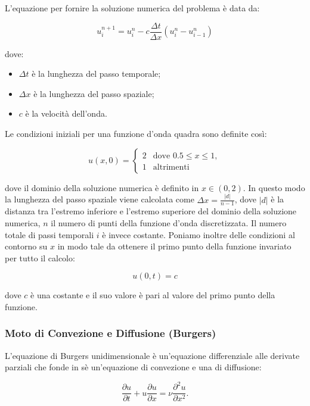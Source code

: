 \noindent
L’equazione per fornire la soluzione numerica del problema è data da:

\begin{equation}
u_i^{n+1} = u_i^n - c \frac{\Delta t}{\Delta x}(u_i^n-u_{i-1}^n)
\end{equation}

\noindent
dove:
\begin{itemize}
\item $\Delta t$ è la lunghezza del passo temporale;
\item $\Delta x$ è la lunghezza del passo spaziale;
\item $c$ è la velocità dell'onda.
\end{itemize}


\noindent
Le condizioni iniziali per una funzione d’onda quadra sono definite così:

\begin{equation}
u(x,0)=\begin{cases}2 & \text{dove } 0.5\leq x \leq 1,\\
1 & \text{altrimenti} 
\end{cases}
\end{equation}

\noindent
dove il dominio della soluzione numerica è definito in $x\in(0,2)$. In questo modo la lunghezza del passo spaziale viene calcolata come $\Delta x = \frac{|d|}{n - 1}$, dove $|d|$ è la distanza tra l'estremo inferiore e l'estremo superiore del dominio della soluzione numerica, $n$ il numero di punti della funzione d'onda discretizzata. Il numero totale di passi temporali $i$ è invece costante.
\noindent
Poniamo inoltre delle condizioni al contorno su $x$ in modo tale da ottenere il primo punto della funzione invariato per tutto il calcolo:

\begin{equation}
u(0,t) = c 
\end{equation}

\noindent
dove $c$ è una costante e il suo valore è pari al valore del primo punto della funzione.

\subsubsection*{Moto di Convezione e Diffusione (Burgers)}
L’equazione di Burgers unidimensionale è un’equazione differenziale alle derivate parziali che fonde in sè un'equazione di convezione e una di diffusione: 

\begin{equation}
\frac{\partial u}{\partial t} + u \frac{\partial u}{\partial x} = \nu \frac{\partial ^2u}{\partial x^2}.
\end{equation}

